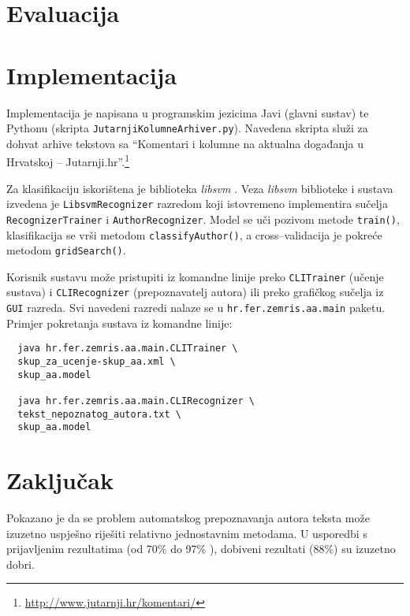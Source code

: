 \documentclass{article}
\begin{document}
\section{Evaluacija}
\label{sec:evaluacija}


\section{Implementacija}
\label{sec:implementacija}
Implementacija je napisana u programskim jezicima Javi (glavni sustav) te
Pythonu (skripta \texttt{JutarnjiKolumneArhiver.py}). Navedena skripta služi za
dohvat arhive tekstova sa ``Komentari i kolumne na aktualna događanja u
Hrvatskoj -- Jutarnji.hr''.\footnote{\url{http://www.jutarnji.hr/komentari/}}


Za klasifikaciju iskorištena je biblioteka \emph{libsvm} \citep{CC01a}. Veza
\emph{libsvm} biblioteke i sustava izvedena je \texttt{LibsvmRecognizer}
razredom koji istovremeno implementira sučelja \texttt{RecognizerTrainer} i
\texttt{AuthorRecognizer}. Model se uči pozivom metode \texttt{train()},
klasifikacija se vrši metodom \texttt{classifyAuthor()}, a cross--validacija je
pokreće metodom \texttt{gridSearch()}.

Korisnik sustavu može pristupiti iz komandne linije preko \texttt{CLITrainer}
(učenje sustava) i \texttt{CLIRecognizer} (prepoznavatelj autora) ili preko
grafičkog sučelja iz \texttt{GUI} razreda. Svi navedeni razredi nalaze se u
\texttt{hr.fer.zemris.aa.main} paketu. Primjer pokretanja sustava iz
komandne linije:
\begin{verbatim}
  java hr.fer.zemris.aa.main.CLITrainer \
  skup_za_ucenje-skup_aa.xml \
  skup_aa.model
  
  java hr.fer.zemris.aa.main.CLIRecognizer \
  tekst_nepoznatog_autora.txt \
  skup_aa.model
\end{verbatim}


\section{Zaključak}
Pokazano je da se problem automatskog prepoznavanja autora teksta može izuzetno
uspješno riješiti relativno jednostavnim metodama. U usporedbi s prijavljenim
rezultatima (od 70\% do 97\%
\citep{coyotl2006authorship,keselj2003n,luyckx2005shallow,stamatatos2001computer}),
dobiveni rezultati (88\%) su izuzetno dobri.
\end{document}
